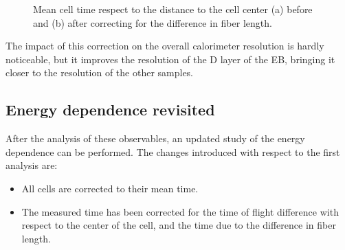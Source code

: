 \begin{figure}[tb!]
\begin{center}
\begin{subfigure}{0.49\textwidth}
      \caption{}
      \label{fig:distancediff_corr_mean}
    \end{subfigure}
  \end{center}
  \caption{Mean cell time respect to the distance to the cell center (a) before and (b) after correcting for the difference in fiber length.}
  \label{fig:distancediff}
\end{figure}

The impact of this correction on the overall calorimeter resolution is hardly noticeable, but it improves the resolution of the D layer of the EB, bringing it closer to the resolution of the other samples.




\subsection{Energy dependence revisited}
After the analysis of these observables, an updated study of the
energy dependence can be performed.
The changes introduced with respect to the first analysis are:
\begin{itemize}
	\item All cells are corrected to their mean time.
	\item The measured time has been corrected for the
          time of flight difference with respect to the center of the cell, and the time due to the difference in fiber length.
\end{itemize}

